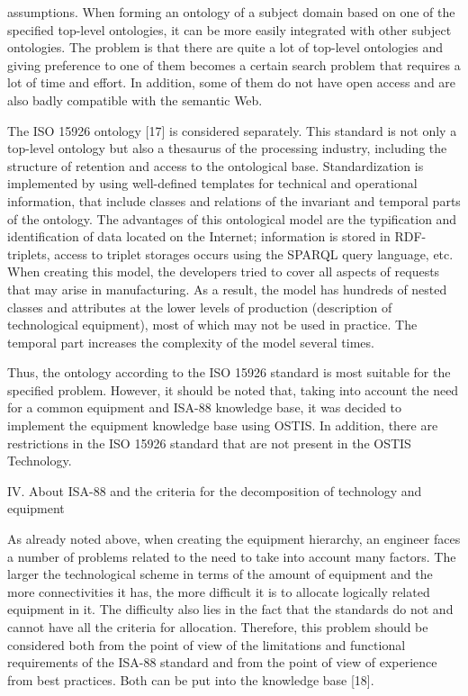 \documentclass[10pt,twocolumn]{article}
\begin{document}
\small
{\setlength{\parindent}{0in} assumptions. When forming an ontology of a subject
domain based on one of the specified top-level ontologies,
it can be more easily integrated with other subject
ontologies. The problem is that there are quite a lot
of top-level ontologies and giving preference to one of
them becomes a certain search problem that requires a
lot of time and effort. In addition, some of them do not
have open access and are also badly compatible with the
semantic Web.}


The ISO 15926 ontology [17] is considered separately.
This standard is not only a top-level ontology but also
a thesaurus of the processing industry, including the
structure of retention and access to the ontological base.
Standardization is implemented by using well-defined
templates for technical and operational information, that
include classes and relations of the invariant and temporal
parts of the ontology. The advantages of this ontological
model are the typification and identification of data located on the Internet; information is stored in RDF-triplets,
access to triplet storages occurs using the SPARQL query
language, etc. When creating this model, the developers
tried to cover all aspects of requests that may arise
in manufacturing. As a result, the model has hundreds
of nested classes and attributes at the lower levels of
production (description of technological equipment), most
of which may not be used in practice. The temporal part
increases the complexity of the model several times.


Thus, the ontology according to the ISO 15926 standard
is most suitable for the specified problem. However, it
should be noted that, taking into account the need for
a common equipment and ISA-88 knowledge base, it
was decided to implement the equipment knowledge base
using OSTIS. In addition, there are restrictions in the
ISO 15926 standard that are not present in the OSTIS
Technology.

\vspace{5mm}
\beginnumbering
\pstart\vfill\noindent\normalsize\leftskip=3mm\rightskip=3mm\sc
IV. About ISA-88 and the criteria for
\pend
\pstart\vfill\noindent\normalsize\leftskip=3mm\rightskip=3mm\sc
the decomposition of technology and
\pend
\pstart\vfill\noindent\normalsize\centering\sc
equipment
\pend
\endnumbering
\vspace{5mm}

As already noted above, when creating the equipment
hierarchy, an engineer faces a number of problems related
to the need to take into account many factors. The larger
the technological scheme in terms of the amount of
equipment and the more connectivities it has, the more
difficult it is to allocate logically related equipment in it.
The difficulty also lies in the fact that the standards do not
and cannot have all the criteria for allocation. Therefore,
this problem should be considered both from the point
of view of the limitations and functional requirements
of the ISA-88 standard and from the point of view of
experience from best practices. Both can be put into the
knowledge base [18].
 
\end{document}
